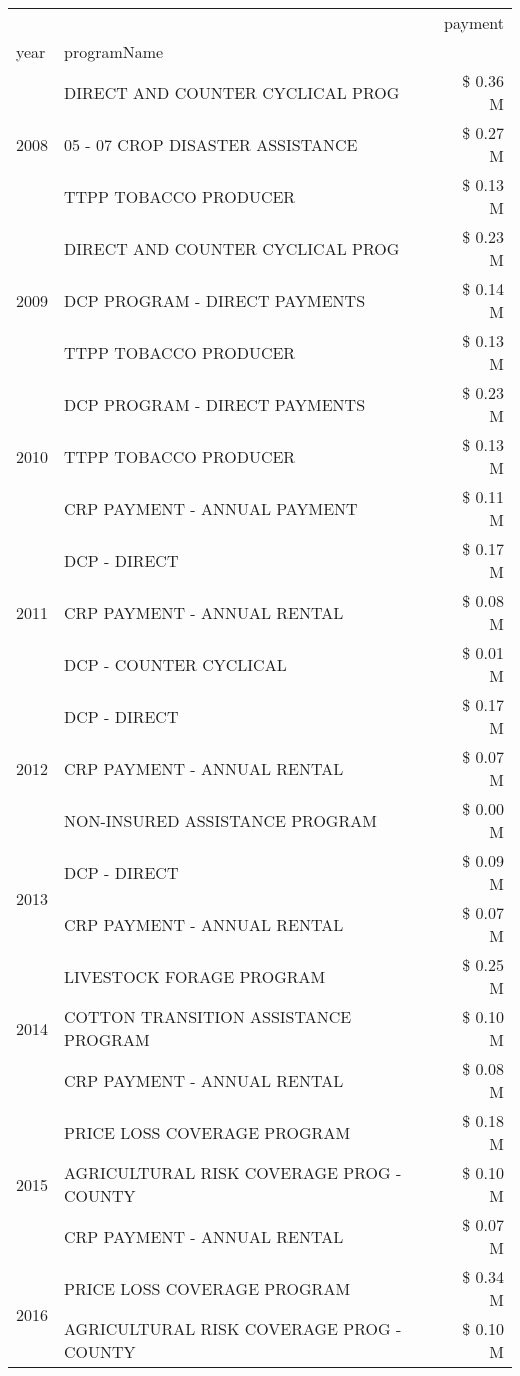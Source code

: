 \begin{tabular}{llr}
\toprule
 &  & payment \\
year & programName &  \\
\midrule
\multirow[t]{3}{*}{2008} & DIRECT AND COUNTER CYCLICAL PROG & \$ 0.36 M \\
 & 05 - 07 CROP DISASTER ASSISTANCE & \$ 0.27 M \\
 & TTPP TOBACCO PRODUCER & \$ 0.13 M \\
\cline{1-3}
\multirow[t]{3}{*}{2009} & DIRECT AND COUNTER CYCLICAL PROG & \$ 0.23 M \\
 & DCP PROGRAM - DIRECT PAYMENTS & \$ 0.14 M \\
 & TTPP TOBACCO PRODUCER & \$ 0.13 M \\
\cline{1-3}
\multirow[t]{3}{*}{2010} & DCP PROGRAM - DIRECT PAYMENTS & \$ 0.23 M \\
 & TTPP TOBACCO PRODUCER & \$ 0.13 M \\
 & CRP PAYMENT - ANNUAL PAYMENT & \$ 0.11 M \\
\cline{1-3}
\multirow[t]{3}{*}{2011} & DCP - DIRECT & \$ 0.17 M \\
 & CRP PAYMENT - ANNUAL RENTAL & \$ 0.08 M \\
 & DCP - COUNTER CYCLICAL & \$ 0.01 M \\
\cline{1-3}
\multirow[t]{3}{*}{2012} & DCP - DIRECT & \$ 0.17 M \\
 & CRP PAYMENT - ANNUAL RENTAL & \$ 0.07 M \\
 & NON-INSURED ASSISTANCE PROGRAM & \$ 0.00 M \\
\cline{1-3}
\multirow[t]{2}{*}{2013} & DCP - DIRECT & \$ 0.09 M \\
 & CRP PAYMENT - ANNUAL RENTAL & \$ 0.07 M \\
\cline{1-3}
\multirow[t]{3}{*}{2014} & LIVESTOCK FORAGE PROGRAM & \$ 0.25 M \\
 & COTTON TRANSITION ASSISTANCE PROGRAM & \$ 0.10 M \\
 & CRP PAYMENT - ANNUAL RENTAL & \$ 0.08 M \\
\cline{1-3}
\multirow[t]{3}{*}{2015} & PRICE LOSS COVERAGE PROGRAM & \$ 0.18 M \\
 & AGRICULTURAL RISK COVERAGE PROG - COUNTY & \$ 0.10 M \\
 & CRP PAYMENT - ANNUAL RENTAL & \$ 0.07 M \\
\cline{1-3}
\multirow[t]{3}{*}{2016} & PRICE LOSS COVERAGE PROGRAM                   & \$ 0.34 M \\
 & AGRICULTURAL RISK COVERAGE PROG - COUNTY      & \$ 0.10 M \\

\end{tabular}
